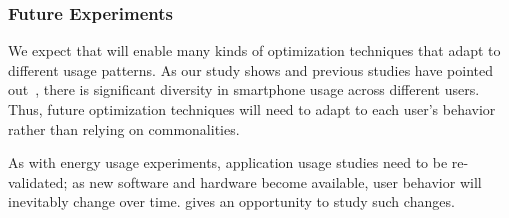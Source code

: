 \subsubsection{Future Experiments}

We expect that \PhoneLab{} will enable many kinds of optimization techniques
that adapt to different usage patterns. As our study shows and previous
studies have pointed out~\cite{falaki:mobisys:2010, shye:micro:2009}, there
is significant diversity in smartphone usage across different users. Thus,
future optimization techniques will need to adapt to each user's behavior
rather than relying on commonalities.

As with energy usage experiments, application usage studies need to be
re-validated; as new software and hardware become available, user behavior will
inevitably change over time. \PhoneLab{} gives an opportunity to study such
changes.
